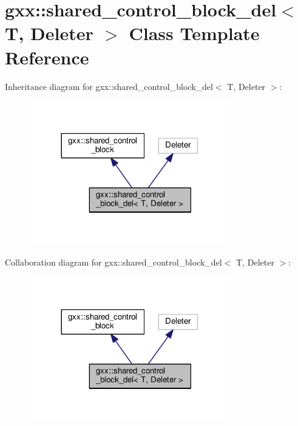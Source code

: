 \hypertarget{classgxx_1_1shared__control__block__del}{}\section{gxx\+:\+:shared\+\_\+control\+\_\+block\+\_\+del$<$ T, Deleter $>$ Class Template Reference}
\label{classgxx_1_1shared__control__block__del}


Inheritance diagram for gxx\+:\+:shared\+\_\+control\+\_\+block\+\_\+del$<$ T, Deleter $>$\+:
\nopagebreak
\begin{figure}[H]
\begin{center}
\leavevmode
\includegraphics[width=248pt]{classgxx_1_1shared__control__block__del__inherit__graph}
\end{center}
\end{figure}


Collaboration diagram for gxx\+:\+:shared\+\_\+control\+\_\+block\+\_\+del$<$ T, Deleter $>$\+:
\nopagebreak
\begin{figure}[H]
\begin{center}
\leavevmode
\includegraphics[width=248pt]{classgxx_1_1shared__control__block__del__coll__graph}
\end{center}
\end{figure}

